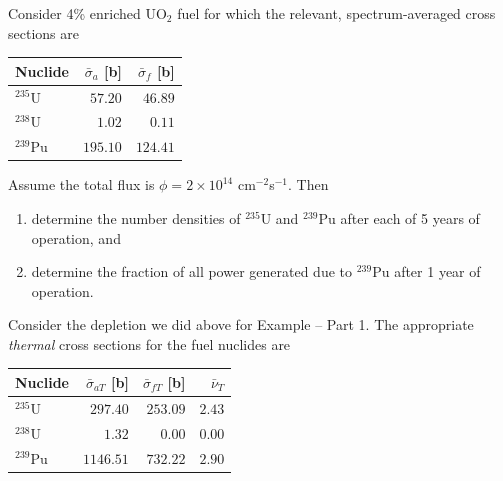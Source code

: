 \documentclass[compact]{ne630handout}
\begin{document}
\colnext
{}
Consider 4\% enriched UO$_2$ fuel for which the relevant, spectrum-averaged
cross sections are

\vspace{5pt}

\begin{center}
\renewcommand{\arraystretch}{1.12}
\begin{tabular}{@{}lrr@{}}
\toprule
Nuclide & $\bar\sigma_a$ [b] & $\bar\sigma_f$ [b]\\
\midrule
${}^{235}$U  & $57.20$  & $46.89$\\
${}^{238}$U  & $1.02$   & $0.11$\\
${}^{239}$Pu & $195.10$ & $124.41$\\
\bottomrule
\end{tabular}
\end{center}


\vspace{5pt}

Assume the total flux is $\phi=2\times10^{14}$ cm$^{-2}$s$^{-1}$. Then
\begin{enumerate}\setlength{\itemsep}{2pt}\setlength{\parsep}{0pt}
 \item determine the number densities of ${}^{235}$U and ${}^{239}$Pu
 after each of 5 years of operation, and
 \item determine the fraction of all power generated due to ${}^{239}$Pu
 after 1 year of operation.
\end{enumerate}
\par\vspace{8pt}

Consider the depletion we did above for Example -- Part 1. The appropriate
\emph{thermal} cross sections for the fuel nuclides are

\vspace{5pt}

\begin{center}
\renewcommand{\arraystretch}{1.12}
\begin{tabular}{@{}lrrr@{}}
\toprule
Nuclide & $\bar\sigma_{aT}$ [b] & $\bar\sigma_{fT}$ [b] & $\bar\nu_T$\\
\midrule
${}^{235}$U  & $297.40$  & $253.09$ & $2.43$\\
${}^{238}$U  & $1.32$    & $0.00$   & $0.00$\\
${}^{239}$Pu & $1146.51$ & $732.22$ & $2.90$\\
\bottomrule
\end{tabular}
\end{center}
\end{document}
